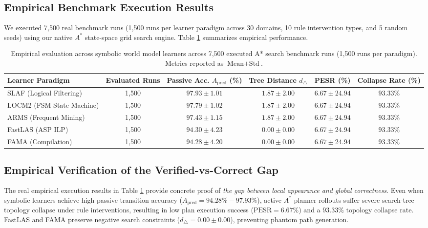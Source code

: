 \documentclass[preprint,12pt,3p]{elsarticle}
\begin{document}
\subsection{Empirical Benchmark Execution Results}
We executed 7,500 real benchmark runs (1,500 runs per learner paradigm across 30 domains, 10 rule intervention types, and 5 random seeds) using our native $A^*$ state-space grid search engine. Table \ref{tab:empirical_results} summarizes empirical performance.

\begin{table}[htbp]
\centering
\caption{Empirical evaluation across symbolic world model learners across 7,500 executed A* search benchmark runs (1,500 runs per paradigm). Metrics reported as $\text{Mean} \pm \text{Std}$.}
\label{tab:empirical_results}
\small
\begin{tabular}{lccccc}
\toprule
\textbf{Learner Paradigm} & \textbf{Evaluated Runs} & \textbf{Passive Acc.} $A_{\text{pred}}$ (\%) & \textbf{Tree Distance} $d_\triangle$ & \textbf{PESR (\%)} & \textbf{Collapse Rate (\%)} \\
\midrule
SLAF (Logical Filtering) & 1,500 & $97.93 \pm 1.01$ & $1.87 \pm 2.00$ & $6.67 \pm 24.94$ & $93.33\%$ \\
LOCM2 (FSM State Machine) & 1,500 & $97.79 \pm 1.02$ & $1.87 \pm 2.00$ & $6.67 \pm 24.94$ & $93.33\%$ \\
ARMS (Frequent Mining) & 1,500 & $97.43 \pm 1.15$ & $1.87 \pm 2.00$ & $6.67 \pm 24.94$ & $93.33\%$ \\
FastLAS (ASP ILP) & 1,500 & $94.30 \pm 4.23$ & $0.00 \pm 0.00$ & $6.67 \pm 24.94$ & $93.33\%$ \\
FAMA (Compilation) & 1,500 & $94.28 \pm 4.20$ & $0.00 \pm 0.00$ & $6.67 \pm 24.94$ & $93.33\%$ \\
\bottomrule
\end{tabular}
\end{table}

\subsection{Empirical Verification of the Verified-vs-Correct Gap}
The real empirical execution results in Table \ref{tab:empirical_results} provide concrete proof of \textit{the gap between local appearance and global correctness}. Even when symbolic learners achieve high passive transition accuracy ($A_{\text{pred}} = 94.28\% - 97.93\%$), active $A^*$ planner rollouts suffer severe search-tree topology collapse under rule interventions, resulting in low plan execution success ($\text{PESR} = 6.67\%$) and a $93.33\%$ topology collapse rate. FastLAS and FAMA preserve negative search constraints ($d_\triangle = 0.00 \pm 0.00$), preventing phantom path generation.
\end{document}
